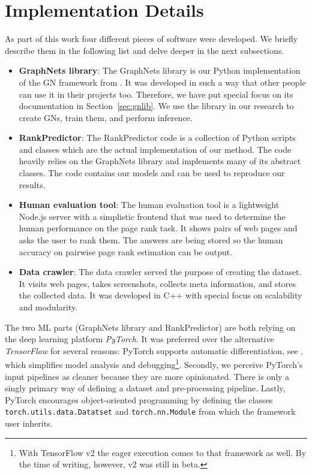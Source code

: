 \section{Implementation Details}
\label{sec:implementationdetails}

As part of this work four different pieces of software were developed. We briefly describe them in the following list and delve deeper in the next subsections.

\begin{itemize}
    \item \textbf{GraphNets library}: The GraphNets library is our Python implementation of the GN framework from \cite{deepmind:graphnets}. It was developed in such a way that other people can use it in their projects too. Therefore, we have put special focus on its documentation in Section~\ref{sec:gnlib}. We use the library in our research to create GNs, train them, and perform inference.
    \item \textbf{RankPredictor}: The RankPredictor code is a collection of Python scripts and classes which are the actual implementation of our method. The code heavily relies on the GraphNets library and implements many of its abstract classes. The code contains our models and can be used to reproduce our results.
    \item \textbf{Human evaluation tool}: The human evaluation tool is a lightweight Node.js server with a simplistic frontend that was used to determine the human performance on the page rank task. It shows pairs of web pages and asks the user to rank them. The answers are being stored so the human accuracy on pairwise page rank estimation can be output.
    \item \textbf{Data crawler}: The data crawler served the purpose of creating the dataset. It visits web pages, takes screenshots, collects meta information, and stores the collected data. It was developed in C++ with special focus on scalability and modularity.
\end{itemize}

The two ML parts (GraphNets library and RankPredictor) are both relying on the deep learning platform \textit{PyTorch}. It was preferred over the alternative \textit{TensorFlow} \cite{abadi2016:tensorflow} for several reasons: PyTorch supports automatic differentiation, see \cite{paszke2017automatic:pytorch}, which simplifies model analysis and debugging\footnote{With TensorFlow v2 the eager execution comes to that framework as well. By the time of writing, however, v2 was still in beta.}. Secondly, we perceive PyTorch's input pipelines as cleaner because they are more opinionated. There is only a singly primary way of defining a dataset and pre-processing pipeline. Lastly, PyTorch encourages object-oriented programming by defining the classes \texttt{torch.utils.data.Datatset} and \texttt{torch.nn.Module} from which the framework user inherits.





